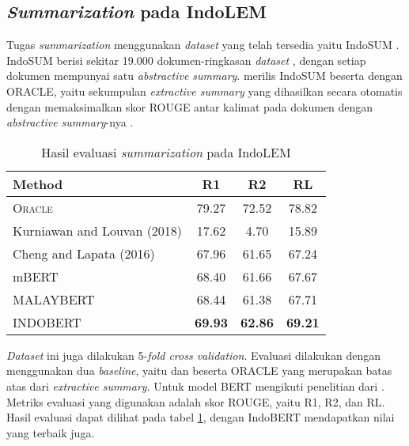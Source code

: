 \subsection{\textit{Summarization} pada IndoLEM}

Tugas \textit{summarization} menggunakan \textit{dataset} yang telah tersedia yaitu IndoSUM \parencite{summarization}. IndoSUM berisi sekitar 19.000 dokumen-ringkasan \textit{dataset} \parencite{indolem}, dengan setiap dokumen mempunyai satu \textit{abstractive summary}. \citeauthor{summarization} merilis IndoSUM beserta dengan ORACLE, yaitu sekumpulan \textit{extractive summary} yang dihasilkan secara otomatis dengan memaksimalkan skor ROUGE antar kalimat pada dokumen dengan \textit{abstractive summary}-nya \parencite{indolem}.

\begin{table}[h]
    \vspace{0.25cm}
    \centering
    \caption{Hasil evaluasi \textit{summarization} pada IndoLEM}
    \label{table:indolem-summarization-result}
    \begin{tabular}{lccc}
        \toprule
        \textbf{Method} & \textbf{R1} & \textbf{R2} & \textbf{RL} \\
        \midrule
        \textsc{Oracle} & 79.27 & 72.52 & 78.82 \\
        Kurniawan and Louvan (2018) & 17.62 & 4.70 & 15.89 \\
        Cheng and Lapata (2016) & 67.96 & 61.65 & 67.24 \\
        mBERT & 68.40 & 61.66 & 67.67 \\
        MALAYBERT & 68.44 & 61.38 & 67.71 \\
        INDOBERT & \textbf{69.93} & \textbf{62.86} & \textbf{69.21} \\
        \bottomrule
    \end{tabular}
\end{table}

\textit{Dataset} ini juga dilakukan 5-\textit{fold cross validation}. Evaluasi dilakukan dengan menggunakan dua \textit{baseline}, yaitu \citeauthor{summarization} dan \citeauthor{summarization_lstm} beserta ORACLE yang merupakan batas atas dari \textit{extractive summary}. Untuk model BERT mengikuti penelitian dari \citeauthor{summarization_bert} \parencite{indolem}. Metriks evaluasi yang digunakan adalah skor ROUGE, yaitu R1, R2, dan RL. Hasil evaluasi dapat dilihat pada tabel \ref{table:indolem-summarization-result}, dengan IndoBERT mendapatkan nilai yang terbaik juga.
